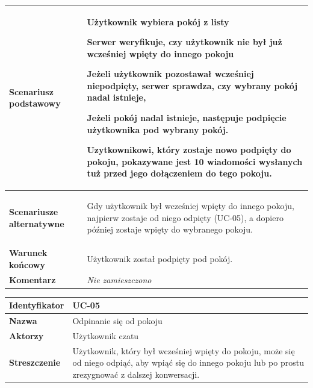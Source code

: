 {\begin{tabular}{ | l | l | }
	\hline
		\textbf{Scenariusz podstawowy} & \parbox[t]{11cm}{
			\begin{enumreq}
				\item Użytkownik wybiera pokój z listy
				\item Serwer weryfikuje, czy użytkownik nie był już wcześniej wpięty do
				innego pokoju
				\item Jeżeli użytkownik pozostawał wcześniej niepodpięty, serwer
				sprawdza, czy wybrany pokój nadal istnieje,
				\item Jeżeli pokój nadal istnieje, następuje podpięcie użytkownika pod
				wybrany pokój.
				\item Uzytkownikowi, który zostaje nowo podpięty do pokoju,	pokazywane
				jest 10 wiadomości wysłanych tuż przed jego dołączeniem do tego pokoju.
			\end{enumreq}
		}
		\\

	\hline
		\textbf{Scenariusze alternatywne} & \parbox[t]
		{11cm}{
			\begin{enumreq}
				\item Gdy użytkownik był wcześniej wpięty do innego pokoju,	najpierw
				zostaje od niego odpięty (UC-05), a dopiero później zostaje wpięty do
				wybranego pokoju.
			\end{enumreq}
		}
		\\

	\hline
		\textbf{Warunek końcowy} & \parbox[t]{11cm}{
			Użytkownik został podpięty pod pokój.
		}
		\\

	\hline
		\textbf{Komentarz} & \parbox[t]{11cm}{
			\textit{Nie zamieszczono}
		}
		\\

	\hline
\end{tabular}

\vspace{2em}

\begin{tabular}{ | l | l | }
	\hline
		\textbf{Identyfikator} &
		UC-05
		\\

	\hline
		\textbf{Nazwa} &
		Odpinanie się od pokoju
		\\

	\hline
		\textbf{Aktorzy} & \parbox[t]{11cm}{
			Użytkownik czatu
		}\\

	\hline
		\textbf{Streszczenie} & \parbox[t]{11cm}{
			Użytkownik, który był wcześniej wpięty do pokoju, może się od niego
			odpiąć, aby wpiąć się do innego pokoju lub po prostu zrezygnować z dalszej
			konwersacji.
		}\\


\end{tabular}}
